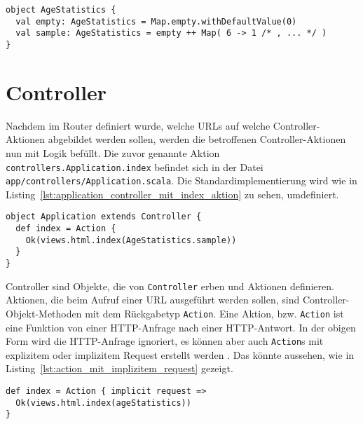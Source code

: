 \begin{lstlisting}[caption=Das AgeStatistics-Hilfsobjekt, label=lst:das_agestatistics_hilfsobjekt]
object AgeStatistics {
  val empty: AgeStatistics = Map.empty.withDefaultValue(0)
  val sample: AgeStatistics = empty ++ Map( 6 -> 1 /* , ... */ )
}
\end{lstlisting}



\section{Controller} %
\label{sec:controller}

Nachdem im Router definiert wurde, welche URLs auf welche Controller-Aktionen abgebildet werden sollen, werden die betroffenen Controller-Aktionen nun mit Logik befüllt.
Die zuvor genannte Aktion \lstinline[breaklines=true]|controllers.Application.index| befindet sich in der Datei \lstinline[breaklines=true]|app/controllers/Application.scala|.
Die Standardimplementierung wird wie in Listing~\ref{lst:application_controller_mit_index_aktion} zu sehen, umdefiniert.

\begin{lstlisting}[caption=Der Application-Controller mit index-Aktion, label=lst:application_controller_mit_index_aktion]
object Application extends Controller {
  def index = Action {
    Ok(views.html.index(AgeStatistics.sample))
  }
}
\end{lstlisting}

Controller sind Objekte, die von \lstinline|Controller| erben und Aktionen definieren.
Aktionen, die beim Aufruf einer URL ausgeführt werden sollen, sind Controller-Objekt-Methoden mit dem Rückgabetyp \lstinline|Action|.
Eine Aktion, bzw. \lstinline|Action| ist eine Funktion von einer HTTP-Anfrage nach einer HTTP-Antwort.
In der obigen Form wird die HTTP-Anfrage ignoriert, es können aber auch \lstinline|Action|s mit explizitem oder implizitem Request erstellt werden \cite[vgl.][]{play_controllers}.
Das könnte aussehen, wie in Listing~\ref{lst:action_mit_implizitem_request} gezeigt.

\begin{lstlisting}[caption=Action mit implizitem Request, label=lst:action_mit_implizitem_request]
def index = Action { implicit request =>
  Ok(views.html.index(ageStatistics))
}
\end{lstlisting}

